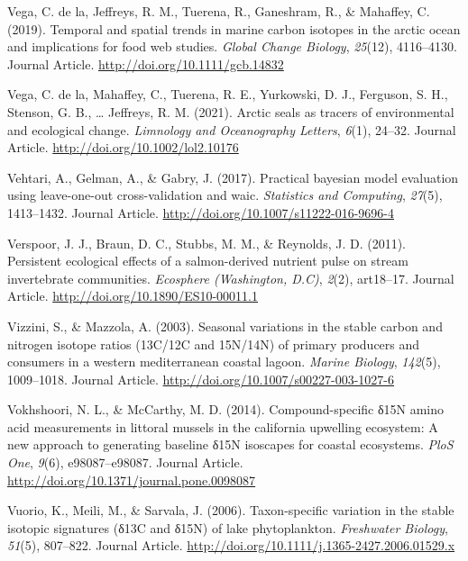 \documentclass [11pt, proquest] {uwthesis}[2015/03/03]
\begin{document}
\hypertarget{ref-delaVega2019}{}
Vega, C. de la, Jeffreys, R. M., Tuerena, R., Ganeshram, R., \&
Mahaffey, C. (2019). Temporal and spatial trends in marine carbon
isotopes in the arctic ocean and implications for food web studies.
\emph{Global Change Biology}, \emph{25}(12), 4116--4130. Journal
Article. \url{http://doi.org/10.1111/gcb.14832}

\hypertarget{ref-delaVega2021}{}
Vega, C. de la, Mahaffey, C., Tuerena, R. E., Yurkowski, D. J.,
Ferguson, S. H., Stenson, G. B., \ldots{} Jeffreys, R. M. (2021). Arctic
seals as tracers of environmental and ecological change. \emph{Limnology
and Oceanography Letters}, \emph{6}(1), 24--32. Journal Article.
\url{http://doi.org/10.1002/lol2.10176}

\hypertarget{ref-Vehtari2017}{}
Vehtari, A., Gelman, A., \& Gabry, J. (2017). Practical bayesian model
evaluation using leave-one-out cross-validation and waic.
\emph{Statistics and Computing}, \emph{27}(5), 1413--1432. Journal
Article. \url{http://doi.org/10.1007/s11222-016-9696-4}

\hypertarget{ref-Verspoor2011}{}
Verspoor, J. J., Braun, D. C., Stubbs, M. M., \& Reynolds, J. D. (2011).
Persistent ecological effects of a salmon-derived nutrient pulse on
stream invertebrate communities. \emph{Ecosphere (Washington, D.C)},
\emph{2}(2), art18--17. Journal Article.
\url{http://doi.org/10.1890/ES10-00011.1}

\hypertarget{ref-Vizzini2003}{}
Vizzini, S., \& Mazzola, A. (2003). Seasonal variations in the stable
carbon and nitrogen isotope ratios (13C/12C and 15N/14N) of primary
producers and consumers in a western mediterranean coastal lagoon.
\emph{Marine Biology}, \emph{142}(5), 1009--1018. Journal Article.
\url{http://doi.org/10.1007/s00227-003-1027-6}

\hypertarget{ref-Vokshoori2014}{}
Vokhshoori, N. L., \& McCarthy, M. D. (2014). Compound-specific δ15N
amino acid measurements in littoral mussels in the california upwelling
ecosystem: A new approach to generating baseline δ15N isoscapes for
coastal ecosystems. \emph{PloS One}, \emph{9}(6), e98087--e98087.
Journal Article. \url{http://doi.org/10.1371/journal.pone.0098087}

\hypertarget{ref-Vuorio2006}{}
Vuorio, K., Meili, M., \& Sarvala, J. (2006). Taxon-specific variation
in the stable isotopic signatures (δ13C and δ15N) of lake phytoplankton.
\emph{Freshwater Biology}, \emph{51}(5), 807--822. Journal Article.
\url{http://doi.org/10.1111/j.1365-2427.2006.01529.x}
\end{document}
